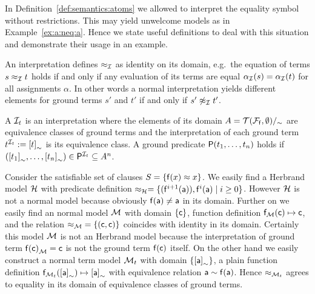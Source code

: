 \noindent In Definition~\vref{def:semantics:atoms} we allowed
to interpret the equality symbol without restrictions.
This may yield unwelcome models as in Example~\vref{ex:a:neq:a}.
Hence we state useful definitions to deal with this situation
and demonstrate their usage in an example.


\begin{definition}\label{def:normal:interpreation}
	An  interpretation defines \( \approx_{\mathcal{I}} \) as identity on its domain,
	e.g.~the equation of terms \( s \approx_{\mathcal{I}} t \) holds if and only
	if any evaluation of its terms are equal \( \alpha_{\mathcal{I}}(s) = \alpha_{\mathcal{I}}(t) \)
	for all assignments \( \alpha \).
	In other words a normal interpretation yields different elements
	for ground terms \( s' \) and \( t' \) if and only if \( s'\not\approx_{\mathcal{I}} t' \).
\end{definition}

\begin{definition}
	A 
	\( \mathcal{I}_t \)
	is an interpretation
	where the elements of its domain \( A = {\mathcal{T}(\mathcal{F}_{\mathsf{f}},\emptyset)}/_\sim \)
	are equivalence classes of ground terms
	and the interpretation of each ground term \( t^{\mathcal{I}_t} := {[t]}_\sim \) is its equivalence class.
	A ground predicate \( \mathsf{P}(t_1,\ldots,t_n) \) holds if
	\( ({[t_1]}_\sim,\ldots,{[t_n]}_\sim) \in \mathsf{P}^{\mathcal{I}_t} \subseteq A^n \).
\end{definition}


\begin{example}
	Consider the satisfiable set of clauses \( S = \{ \mathsf{f}(x) \approx x \} \).
	We easily find a Herbrand model \( \mathcal{H} \) with
	predicate definition
	\( \approx_{\mathcal{H}} = \{ (\mathsf{f}^{i+1}(\mathsf{a})), \mathsf{f}^{i}(\mathsf{a}) \mid i\geq 0  \}  \).
	However \( \mathcal{H} \) is not a normal model because obviously \( \mathsf{f}(\mathsf{a})\neq\mathsf{a} \) in its domain.
	Further on we easily find an normal model \( \mathcal{M} \)
	with domain \( \{ \mathsf{c} \} \), function definition \( \mathsf{f}_{\mathcal{M}}(\mathsf{c}) \mapsto \mathsf{c} \),
	and the relation \( {\approx_{\mathcal{M}}} = \{ (\mathsf{c},\mathsf{c})\} \) coincides with identity in its domain.
	Certainly this model \( \mathcal{M} \) is not an Herbrand model
	because the interpretation of ground term \( {\mathsf{f}(\mathsf{c})}_{\mathcal{M}} = \mathsf{c} \) is not the ground term \( \mathsf{f}(\mathsf{c}) \) itself.
	On the other hand we easily construct a normal term model
	\( \mathcal{M}_t \) with domain \( \{ {[\mathsf{a}]}_\sim \} \),
	a plain function definition
	\( \mathsf{f}_{\mathcal{M}_t}({[\mathsf{a}]}_\sim) \mapsto {[\mathsf{a}]}_\sim \)
	with equivalence relation
	\( \mathsf{a} \sim \mathsf{f}(\mathsf{a}) \).
	Hence \( \approx_{\mathcal{M}_t} \) agrees to equality in its domain of equivalence classes of ground terms.
\end{example}

